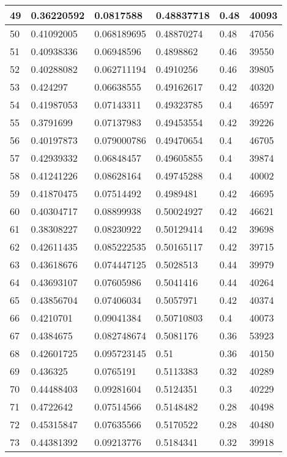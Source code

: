 \begin{longtable}{|l|l|l|l|l|l|}
49 & 0.36220592 & 0.0817588 & 0.48837718 & 0.48 & 40093 \\ \hline 
50 & 0.41092005 & 0.068189695 & 0.48870274 & 0.48 & 47056 \\ \hline 
51 & 0.40938336 & 0.06948596 & 0.4898862 & 0.46 & 39550 \\ \hline 
52 & 0.40288082 & 0.062711194 & 0.4910256 & 0.46 & 39805 \\ \hline 
53 & 0.424297 & 0.06638555 & 0.49162617 & 0.42 & 40320 \\ \hline 
54 & 0.41987053 & 0.07143311 & 0.49323785 & 0.4 & 46597 \\ \hline 
55 & 0.3791699 & 0.07137983 & 0.49453554 & 0.42 & 39226 \\ \hline 
56 & 0.40197873 & 0.079000786 & 0.49470654 & 0.4 & 46705 \\ \hline 
57 & 0.42939332 & 0.06848457 & 0.49605855 & 0.4 & 39874 \\ \hline 
58 & 0.41241226 & 0.08628164 & 0.49745288 & 0.4 & 40002 \\ \hline 
59 & 0.41870475 & 0.07514492 & 0.4989481 & 0.42 & 46695 \\ \hline 
60 & 0.40304717 & 0.08899938 & 0.50024927 & 0.42 & 46621 \\ \hline 
61 & 0.38308227 & 0.08230922 & 0.50129414 & 0.42 & 39698 \\ \hline 
62 & 0.42611435 & 0.085222535 & 0.50165117 & 0.42 & 39715 \\ \hline 
63 & 0.43618676 & 0.074447125 & 0.5028513 & 0.44 & 39979 \\ \hline 
64 & 0.43693107 & 0.07605986 & 0.5041416 & 0.44 & 40264 \\ \hline 
65 & 0.43856704 & 0.07406034 & 0.5057971 & 0.42 & 40374 \\ \hline 
66 & 0.4210701 & 0.09041384 & 0.50710803 & 0.4 & 40073 \\ \hline 
67 & 0.4384675 & 0.082748674 & 0.5081176 & 0.36 & 53923 \\ \hline 
68 & 0.42601725 & 0.095723145 & 0.51 & 0.36 & 40150 \\ \hline 
69 & 0.436325 & 0.0765191 & 0.5113383 & 0.32 & 40289 \\ \hline 
70 & 0.44488403 & 0.09281604 & 0.5124351 & 0.3 & 40229 \\ \hline 
71 & 0.4722642 & 0.07514566 & 0.5148482 & 0.28 & 40498 \\ \hline 
72 & 0.45315847 & 0.07635566 & 0.5170522 & 0.28 & 40480 \\ \hline 
73 & 0.44381392 & 0.09213776 & 0.5184341 & 0.32 & 39918 \\ \hline 

\end{longtable}
